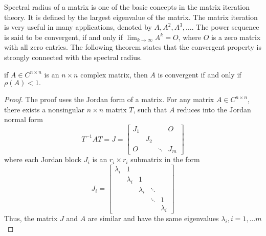 Spectral radius of a matrix is one of the basic concepts in the matrix
iteration theory. It is defined by the largest eigenvalue of the matrix.
The matrix iteration is very useful in many applications, denoted
by $A,A^{2},A^{3},\ldots$. The power sequence is said to be convergent,
if and only if $\lim_{k\to\infty}A^{k}=O$, where $O$ is a zero matrix
with all zero entries. The following theorem states that the convergent
property is strongly connected with the spectral radius. 
\begin{thm}
\label{thm:Convergent <=00003D> p(A)<1} if $A\in C^{n\times n}$
is an $n\times n$ complex matrix, then $A$ is convergent if and
only if $\rho\left(A\right)<1.$\end{thm}
\begin{proof}
The proof uses the Jordan form of a matrix. For any matrix $A\in C^{n\times n}$,
there exists a nonsingular $n\times n$ matrix $T$, such that $A$
reduces into the Jordan normal form 
\begin{equation}
T^{-1}AT=J=\left[\begin{array}{cccc}
J_{1} &  &  & O\\
 & J_{2}\\
O &  & \ddots & J_{m}
\end{array}\right]
\end{equation}
 where each Jordan block $J_{i}$ is an $r_{i}\times r_{i}$ submatrix
in the form 
\begin{equation}
J_{i}=\left[\begin{array}{ccccc}
\lambda_{i} & 1\\
 & \lambda_{i} & 1\\
 &  & \lambda_{i} & \ddots\\
 &  &  & \ddots & 1\\
 &  &  &  & \lambda_{i}
\end{array}\right]
\end{equation}
Thus, the matrix $J$ and $A$ are similar and have the same eigenvalues
$\lambda_{i},i=1,\ldots m$


\end{proof}
